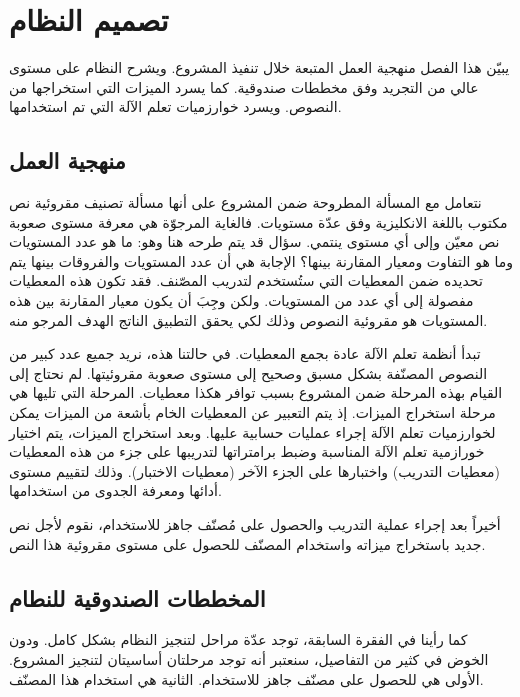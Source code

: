 

\chapter{تصميم النظام}
يبيّن هذا الفصل منهجية العمل المتبعة خلال تنفيذ المشروع.
ويشرح النظام على مستوى عالي من التجريد وفق مخططات صندوقية.
كما يسرد الميزات التي استخراجها من النصوص.
ويسرد خوارزميات تعلم الآلة التي تم استخدامها.

\section{منهجية العمل}
نتعامل مع المسألة المطروحة ضمن المشروع على أنها مسألة تصنيف مقروئية نص مكتوب باللغة الانكليزية وفق عدّة مستويات.
فالغاية المرجوّة هي معرفة مستوى صعوبة نص معيّن وإلى أي مستوى ينتمي.
سؤال قد يتم طرحه هنا وهو: ما هو عدد المستويات وما هو التفاوت ومعيار المقارنة بينها؟
الإجابة هي أن عدد المستويات والفروقات بينها يتم تحديده ضمن المعطيات التي ستُستخدم لتدريب المصّنف.
فقد تكون هذه المعطيات مفصولة إلى أي عدد من المستويات.
ولكن وجِبَ أن يكون معيار المقارنة بين هذه المستويات هو مقروئية النصوص وذلك لكي يحقق التطبيق الناتج الهدف المرجو منه.

تبدأ أنظمة تعلم الآلة عادة بجمع المعطيات.
في حالتنا هذه، نريد جميع عدد كبير من النصوص المصنّفة بشكل مسبق وصحيح إلى مستوى صعوبة مقروئيتها.
لم نحتاج إلى القيام بهذه المرحلة ضمن المشروع بسبب توافر هكذا معطيات.
المرحلة التي تليها هي مرحلة استخراج الميزات.
إذ يتم التعبير عن المعطيات الخام بأشعة من الميزات يمكن لخوارزميات تعلم الآلة إجراء عمليات حسابية عليها.
وبعد استخراج الميزات، يتم اختيار خورازمية تعلم الآلة المناسبة وضبط برامتراتها 
لتدريبها على جزء من هذه المعطيات (معطيات التدريب) واختبارها على الجزء الآخر (معطيات الاختبار).
وذلك لتقييم مستوى أدائها ومعرفة الجدوى من استخدامها.

أخيراً بعد إجراء عملية التدريب والحصول على مُصنّف جاهز للاستخدام،
نقوم لأجل نص جديد باستخراج ميزاته واستخدام المصنّف للحصول على مستوى مقروئية هذا النص.


\section{المخططات الصندوقية للنطام}
كما رأينا في الفقرة السابقة، توجد عدّة مراحل لتنجيز النظام بشكل كامل.
ودون الخوض في كثير من التفاصيل، سنعتبر أنه توجد مرحلتان أساسيتان لتنجيز المشروع.
الأولى هي للحصول على مصنّف جاهز للاستخدام.
الثانية هي استخدام هذا المصنّف.

